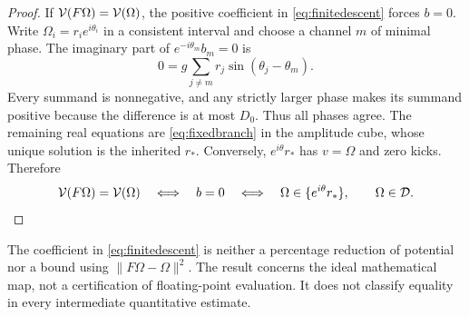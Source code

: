\begin{proof}
If \(\mathcal V(F\Omega)=\mathcal V(\Omega)\), the positive coefficient in \eqref{eq:finitedescent} forces \(b=0\). Write \(\Omega_i=r_i e^{i\theta_i}\) in a consistent interval and choose a channel \(m\) of minimal phase. The imaginary part of \(e^{-i\theta_m}b_m=0\) is
\begin{equation}
0=g\sum_{j\ne m}r_j\sin(\theta_j-\theta_m).
\label{eq:minimumphase}
\end{equation}
Every summand is nonnegative, and any strictly larger phase makes its summand positive because the difference is at most \(D_0\). Thus all phases agree. The remaining real equations are \eqref{eq:fixedbranch} in the amplitude cube, whose unique solution is the inherited \(r_*\). Conversely, \(e^{i\theta}r_*\) has \(v=\Omega\) and zero kicks. Therefore
\begin{equation}
\mathcal V(F\Omega)=\mathcal V(\Omega)
\quad\Longleftrightarrow\quad b=0
\quad\Longleftrightarrow\quad
\Omega\in\{e^{i\theta}r_*\},\qquad \Omega\in\mathcal D.
\label{eq:finiteequality}
\end{equation}
\end{proof}

The coefficient in \eqref{eq:finitedescent} is neither a percentage reduction of potential nor a bound using \(\|F\Omega-\Omega\|^2\). The result concerns the ideal mathematical map, not a certification of floating-point evaluation. It does not classify equality in every intermediate quantitative estimate.
